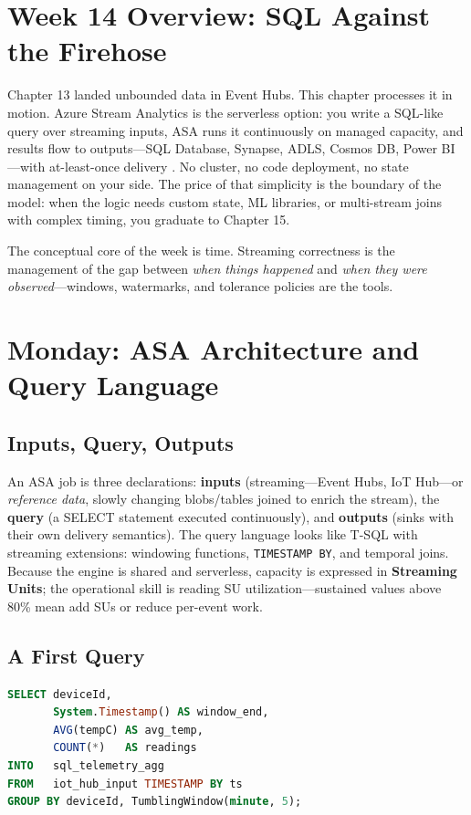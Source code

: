 \section{Week 14 Overview: SQL Against the Firehose}
Chapter 13 landed unbounded data in Event Hubs. This chapter processes it in motion. Azure Stream Analytics is the serverless option: you write a SQL-like query over streaming inputs, ASA runs it continuously on managed capacity, and results flow to outputs---SQL Database, Synapse, ADLS, Cosmos DB, Power BI---with at-least-once delivery \cite{microsoft2025asa}. No cluster, no code deployment, no state management on your side. The price of that simplicity is the boundary of the model: when the logic needs custom state, ML libraries, or multi-stream joins with complex timing, you graduate to Chapter 15.

The conceptual core of the week is time. Streaming correctness is the management of the gap between \emph{when things happened} and \emph{when they were observed}---windows, watermarks, and tolerance policies are the tools.

\section{Monday: ASA Architecture and Query Language}

\subsection{Inputs, Query, Outputs}
An ASA job is three declarations: \textbf{inputs} (streaming---Event Hubs, IoT Hub---or \emph{reference data}, slowly changing blobs/tables joined to enrich the stream), the \textbf{query} (a SELECT statement executed continuously), and \textbf{outputs} (sinks with their own delivery semantics). The query language looks like T-SQL with streaming extensions: windowing functions, \texttt{TIMESTAMP BY}, and temporal joins. Because the engine is shared and serverless, capacity is expressed in \textbf{Streaming Units}; the operational skill is reading SU utilization---sustained values above 80\% mean add SUs or reduce per-event work.

\subsection{A First Query}
\begin{lstlisting}[language=SQL,caption={Continuous aggregation from Event Hubs to Azure SQL, in event time.},label={lst:ch14-basic}]
SELECT deviceId,
       System.Timestamp() AS window_end,
       AVG(tempC) AS avg_temp,
       COUNT(*)   AS readings
INTO   sql_telemetry_agg
FROM   iot_hub_input TIMESTAMP BY ts
GROUP BY deviceId, TumblingWindow(minute, 5);
\end{lstlisting}

